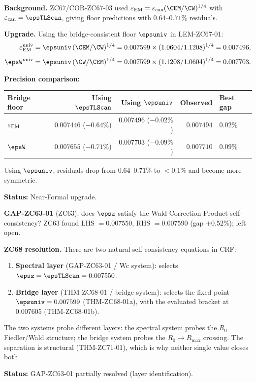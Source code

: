 \documentclass[12pt, a4paper]{article}
\renewcommand{\epsEM}{\varepsilon_{\rm EM}}
\renewcommand{\epscan}{\varepsilon_{\rm can}}
\begin{document}
\begin{formalbox}[title={COR-ZC68-01: Bridge Theorems Upgraded
  to $\epsuniv$ Floor ($R_0/R_{\max}$)}]

\textbf{Background.}
ZC67/COR-ZC67-03 used $\epsEM=\epscan(\CEM/\CW)^{1/4}$ with
$\epscan=\epsTLScan$, giving floor predictions with $0.64$--$0.71\%$
residuals.

\textbf{Upgrade.}
Using the bridge-consistent floor $\epsuniv$ in LEM-ZC67-01:
\begin{align}
  \epsEM^{\rm univ} &= \epsuniv\,(\CEM/\CW)^{1/4}
  = 0.007599\times(1.0604/1.1208)^{1/4} = 0.007496, \\[4pt]
  \epsW^{\rm univ}  &= \epsuniv\,(\CW/\CEM)^{1/4}
  = 0.007599\times(1.1208/1.0604)^{1/4} = 0.007703.
\end{align}

\textbf{Precision comparison:}
\begin{center}
\renewcommand{\arraystretch}{1.25}
\begin{tabular}{@{}lrrrl@{}}
\toprule
Bridge floor & Using $\epsTLScan$ & Using $\epsuniv$ & Observed & Best gap \\
\midrule
$\epsEM$ & $0.007446$ ($-0.64\%$) & $0.007496$ ($-0.02\%$) & $0.007494$ & $0.02\%$ \\
$\epsW$  & $0.007655$ ($-0.71\%$) & $0.007703$ ($-0.09\%$) & $0.007710$ & $0.09\%$ \\
\bottomrule
\end{tabular}
\end{center}

Using $\epsuniv$, residuals drop from $0.64$--$0.71\%$ to $<0.1\%$ and
become more symmetric.

\textbf{Status:} Near-Formal upgrade.
\end{formalbox}


\begin{derivedbox}[title={COR-ZC68-02: GAP-ZC63-01 Partially Resolved
  --- Two-Layer Floor Structure}]

\textbf{GAP-ZC63-01} (ZC63): does $\epsz$ satisfy the Wald Correction
Product self-consistency? ZC63 found LHS $=0.007550$, RHS $=0.007590$
(gap $+0.52\%$); left open.

\textbf{ZC68 resolution.}
There are two natural self-consistency equations in CRF:
\begin{enumerate}[leftmargin=2em,noitemsep]
  \item \textbf{Spectral layer} (GAP-ZC63-01 / Wc system):
    selects $\epsz=\epsTLScan=0.007550$.
  \item \textbf{Bridge layer} (THM-ZC68-01 / bridge system):
    selects the fixed point $\epsuniv=0.007599$ (THM-ZC68-01a), with the
    evaluated bracket at $0.007605$ (THM-ZC68-01b).
\end{enumerate}
The two systems probe different layers: the spectral system probes the
$R_0$ Fiedler/Wald structure; the bridge system probes the
$R_0\to R_{\max}$ crossing. The separation is structural
(THM-ZC71-01), which is why neither single value closes both.

\textbf{Status:} GAP-ZC63-01 partially resolved (layer identification).
\end{derivedbox}
\end{document}
